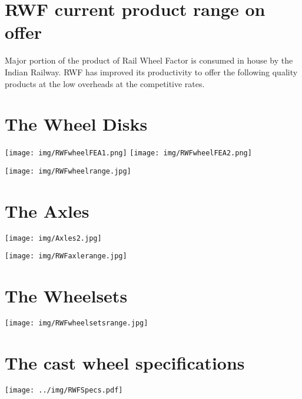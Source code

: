 \section{RWF current product range on offer}

Major portion of the product of Rail Wheel Factor is consumed in house by the Indian Railway.
RWF has improved its productivity to offer the following quality products at the low overheads at the competitive rates.

\section{The Wheel Disks}

\begin{center}
\texttt{[image: img/RWFwheelFEA1.png]} \quad
\texttt{[image: img/RWFwheelFEA2.png]}
\end{center}

\texttt{[image: img/RWFwheelrange.jpg]}




\section{The Axles}

\begin{center}
\texttt{[image: img/Axles2.jpg]} 
\end{center}

\texttt{[image: img/RWFaxlerange.jpg]}




\section{The Wheelsets}

\texttt{[image: img/RWFwheelsetsrange.jpg]}

\section{The cast wheel specifications}

\begin{center}
	\texttt{[image: ../img/RWFSpecs.pdf]} 
\end{center}

